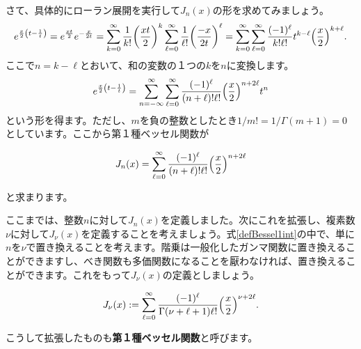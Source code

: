 \documentclass[report,paper=a4, fontsize=12pt, line_length=16cm, number_of_lines=33,dvipdfmx]{jlreq}
\newenvironment{important}{\begin{tcolorbox}[
  colback = white,
  colframe = red!35,
  boxrule = 2mm,
  fonttitle = \bfseries,
  after = \noindent] }{\end{tcolorbox}}
\numberwithin{equation}{section}
\newcommand{\strong}[1]{\textsf{\bfseries #1}}
\begin{document}
さて、具体的にローラン展開を実行して$J_n(x)$の形を求めてみましょう。
\begin{align}
  e^{\frac{x}{2}\qty(t-\frac{1}{t})}=e^{\frac{xt}{2}}e^{-\frac{x}{2t}}
  =\sum_{k=0}^{\infty}\frac{1}{k!}\qty(\frac{xt}{2})^k
  \sum_{\ell=0}^{\infty}\frac{1}{\ell !}\qty(\frac{-x}{2t})^{\ell}
  =\sum_{k=0}^{\infty}\sum_{\ell=0}^{\infty}\frac{(-1)^{\ell}}{k!\ell !}t^{k-\ell}\qty(\frac{x}{2})^{k+\ell}.
\end{align}
ここで$n=k-\ell$とおいて、和の変数の１つの$k$を$n$に変換します。
\begin{align}
  e^{\frac{x}{2}\qty(t-\frac{1}{t})}=\sum_{n=-\infty}^{\infty}
  \sum_{\ell=0}^{\infty}\frac{(-1)^{\ell}}{(n+\ell)!\ell !}\qty(\frac{x}{2})^{n+2\ell}
  t^{n}
\end{align}
という形を得ます。ただし、$m$を負の整数としたとき$1/m!=1/\Gamma(m+1)=0$としています。ここから第１種ベッセル関数が
\begin{important}
  \begin{align}
    J_n(x)=\sum_{\ell=0}^{\infty}\frac{(-1)^{\ell}}{(n+\ell)!\ell !}\qty(\frac{x}{2})^{n+2\ell}\label{defBessel1int}
  \end{align}
\end{important}
と求まります。

ここまでは、整数$n$に対して$J_n(x)$を定義しました。次にこれを拡張し、複素数$\nu$に対して$J_{\nu}(x)$を定義することを考えましょう。式\eqref{defBessel1int}の中で、単に$n$を$\nu$で置き換えることを考えます。階乗は一般化したガンマ関数に置き換えることができますし、べき関数も多価関数になることを厭わなければ、置き換えることができます。これをもって$J_{\nu}(x)$の定義としましょう。
\begin{important}
  \begin{align}
    J_{\nu}(x):=\sum_{\ell=0}^{\infty}\frac{(-1)^{\ell}}{\Gamma(\nu+\ell+1)\ell !}\qty(\frac{x}{2})^{\nu+2\ell}.\label{defBessel1}
  \end{align}
\end{important}
こうして拡張したものも\strong{第１種ベッセル関数}と呼びます。
\end{document}
